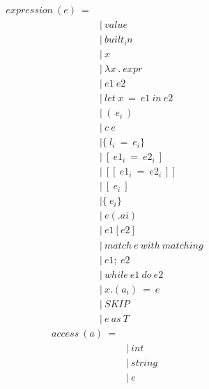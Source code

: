 \documentclass[10pt,a4paper]{article}
\begin{document}
\begin{align*}
expression\ (e)\ = 
\\
 \ &|\ value                            \tag{values}
\\
 \ &|\ built_in                         \tag{built-in\ function}
\\
 \ &|\ x                                \tag{variables}
\\
 \ &|\ \lambda x\ .\ expr                        \tag{lambda}
\\
 \ &|\ e1\ e2                            \tag{application}
\\
 \ &|\ let\ x\ =\ e1\ in\ e2                 \tag{let\ in}
\\
 \ &|\ (\ e_i\ )                          \tag{tuple}
\\
 \ &|\ c\ e                              \tag{constructor}
\\
 \ &| \{\ l_i\ =\ e_i \}                    \tag{record}
\\
 \ &|\ [\ e1_i\ =\ e2_i\ ]                  \tag{map}
\\
 \ &|\ [[\ e1_i\ =\ e2_i\ ]]                \tag{big\ map}
\\
 \ &|\ [\ e_i\ ]                          \tag{list}
\\
 \ &| \{\ e_i \}                          \tag{set}
\\
 \ &|\ e(.ai)                           \tag{accessor}
\\
 \ &|\ e1[e2]                           \tag{look\ up}
\\
 \ &|\ match\ e\ with\ matching            \tag{matching}
\\
 \ &|\ e1;\ e2                           \tag{sequence}
\\
 \ &|\ while\ e1\ do\ e2                   \tag{loop}
\\
 \ &|\ x.(a_i)\ =\ e                      \tag{assign}
\\
 \ &|\ SKIP                             \tag{skip}
\\
 \ &|\ e\ as\ T                           \tag{ascription}
\end{align*}
\begin{align*}
access\ (a)\ = 
\\
 \ &|\ int                              \tag{for\ tuples}
\\
 \ &|\ string                           \tag{for\ record}
\\
 \ &|\ e                                \tag{for\ map}
\end{align*}
\end{document}
